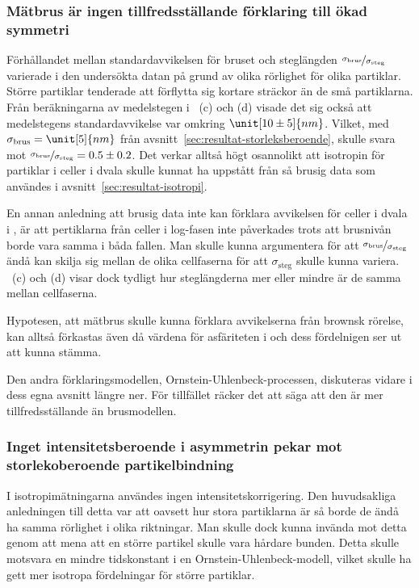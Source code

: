 \subsubsection{Mätbrus är ingen tillfredsställande förklaring till ökad symmetri}
Förhållandet mellan standardavvikelsen för bruset och steglängden $\nicefrac{\sigma_\text{brus}}{\sigma_\text{steg}}$ varierade i den undersökta datan på grund av olika rörlighet för olika partiklar. Större partiklar tenderade att förflytta sig kortare sträckor än de små partiklarna. Från beräkningarna av medelstegen i ~(c) och (d) visade det sig också att medelstegens standardavvikelse var omkring $\unit[10\pm 5]{nm}$. Vilket, med $\sigma_\text{brus}=\unit[5]{nm}$ från avsnitt~\ref{sec:resultat-storleksberoende}, skulle svara mot $\nicefrac{\sigma_\text{brus}}{\sigma_\text{steg}}=0.5\pm 0.2$. Det verkar alltså högt osannolikt att isotropin för partiklar i celler i dvala skulle kunnat ha uppstått från så brusig data som användes i avsnitt~\ref{sec:resultat-isotropi}. 

En annan anledning att brusig data inte kan förklara avvikelsen för celler i dvala i , är att pertiklarna från celler i log-fasen inte påverkades trots att brusnivån borde vara samma i båda fallen. Man skulle kunna argumentera för att $\nicefrac{\sigma_\text{brus}}{\sigma_\text{steg}}$ ändå kan skilja sig mellan de olika cellfaserna för att $\sigma_\text{steg}$ skulle kunna variera. ~(c) och (d) visar dock tydligt hur steglängderna mer eller mindre är de samma mellan cellfaserna.

Hypotesen, att mätbrus skulle kunna förklara avvikelserna från brownsk rörelse, kan alltså förkastas även då värdena för asfäriteten i  och dess fördelnigen  ser ut att kunna stämma. 

Den andra förklaringsmodellen, Ornstein-Uhlenbeck-processen, diskuteras vidare i dess egna avsnitt längre ner. För tillfället räcker det att säga att den är mer tillfredsställande än brusmodellen. 



\subsubsection{Inget intensitetsberoende i asymmetrin pekar mot storlekoberoende partikelbindning}
I isotropimätningarna användes ingen intensitetskorrigering. Den huvudsakliga anledningen till detta var att oavsett hur stora partiklarna är så borde de ändå ha samma rörlighet i olika riktningar. Man skulle dock kunna invända mot detta genom att mena att en större partikel skulle vara hårdare bunden. Detta skulle motsvara en mindre tidskonstant i en Ornstein-Uhlenbeck-modell, vilket skulle ha gett mer isotropa fördelningar för större partiklar.

